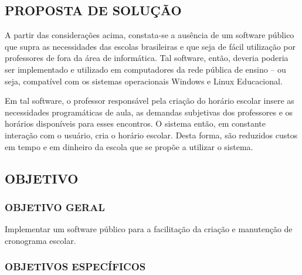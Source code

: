 \documentclass[12pt,a4paper]{article}
\begin{document}
		\subsection{PROPOSTA DE SOLUÇÃO}

			 \par A partir das considerações acima, constata-se a ausência de um software público \cite{publico} que supra as necessidades das escolas brasileiras e que seja de fácil utilização por professores de fora da área de informática. Tal software, então, deveria poderia ser implementado e utilizado em computadores da rede pública de ensino -- ou seja, compatível com os sistemas operacionais Windows e Linux Educacional.

			 \par Em tal software, o professor responsável pela criação do horário escolar insere as necessidades programáticas de aula, as demandas subjetivas dos professores e os horários disponíveis para esses encontros. O sistema então, em constante interação com o usuário, cria o horário escolar.  Desta forma, são reduzidos custos em tempo e em dinheiro da escola que se propõe a utilizar o sistema.

		\subsection{OBJETIVO}

			\subsubsection{OBJETIVO GERAL}

				\par Implementar um software público para a facilitação da criação e manutenção de cronograma escolar.

			\subsubsection{OBJETIVOS ESPECÍFICOS}
\end{document}
